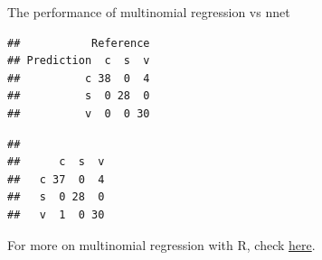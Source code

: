 \documentclass[10pt,ignorenonframetext,]{beamer}
\newenvironment{Shaded}{\begin{snugshade}}{\end{snugshade}}
\newcommand{\KeywordTok}[1]{\textcolor[rgb]{0.13,0.29,0.53}{\textbf{#1}}}
\newcommand{\DataTypeTok}[1]{\textcolor[rgb]{0.13,0.29,0.53}{#1}}
\newcommand{\StringTok}[1]{\textcolor[rgb]{0.31,0.60,0.02}{#1}}
\newcommand{\OperatorTok}[1]{\textcolor[rgb]{0.81,0.36,0.00}{\textbf{#1}}}
\newcommand{\NormalTok}[1]{#1}
\begin{document}
\begin{frame}[fragile]

\begin{block}{The performance of multinomial regression vs nnet}

\scriptsize

\begin{Shaded}
\end{Shaded}

\begin{verbatim}
##           Reference
## Prediction  c  s  v
##          c 38  0  4
##          s  0 28  0
##          v  0  0 30
\end{verbatim}

\begin{Shaded}
\end{Shaded}

\begin{verbatim}
##    
##      c  s  v
##   c 37  0  4
##   s  0 28  0
##   v  1  0 30
\end{verbatim}

\end{block}

\end{frame}

\begin{frame}

For more on multinomial regression with R, check
\href{https://www.r-bloggers.com/\%F0\%9F\%93\%8A-multinomial-regression-in-r/}{here}.

\end{frame}
\end{document}

